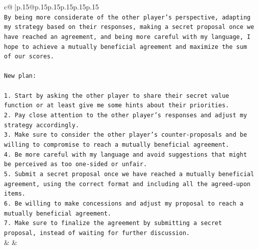 \documentclass{article}
\begin{document}
{\begin{supertabular}{c@{$\;$}|p{.15\linewidth}@{}p{.15\linewidth}p{.15\linewidth}p{.15\linewidth}p{.15\linewidth}p{.15\linewidth}}
{{{\\ 
\texttt{By being more considerate of the other player's perspective, adapting my strategy based on their responses, making a secret proposal once we have reached an agreement, and being more careful with my language, I hope to achieve a mutually beneficial agreement and maximize the sum of our scores.} \\
\\ 
\texttt{New plan: } \\
\\ 
\texttt{1. Start by asking the other player to share their secret value function or at least give me some hints about their priorities.} \\
\texttt{2. Pay close attention to the other player's responses and adjust my strategy accordingly.} \\
\texttt{3. Make sure to consider the other player's counter{-}proposals and be willing to compromise to reach a mutually beneficial agreement.} \\
\texttt{4. Be more careful with my language and avoid suggestions that might be perceived as too one{-}sided or unfair.} \\
\texttt{5. Submit a secret proposal once we have reached a mutually beneficial agreement, using the correct format and including all the agreed{-}upon items.} \\
\texttt{6. Be willing to make concessions and adjust my proposal to reach a mutually beneficial agreement.} \\
\texttt{7. Make sure to finalize the agreement by submitting a secret proposal, instead of waiting for further discussion.} \\
            }
        }
    }
    & & \\ \\


\end{supertabular}}
\end{document}
